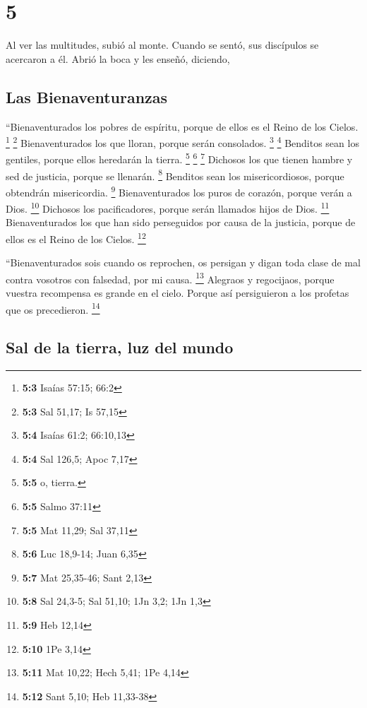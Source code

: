 \hypertarget{section-4}{%
\section{5}\label{section-4}}

 Al ver las multitudes, subió al monte. Cuando se sentó,
sus discípulos se acercaron a él.  Abrió la boca y les
enseñó, diciendo,

\hypertarget{las-bienaventuranzas}{%
\subsection{Las Bienaventuranzas}\label{las-bienaventuranzas}}

 ``Bienaventurados los pobres de espíritu, porque de ellos
es el Reino de los Cielos. \footnote{\textbf{5:3} Isaías 57:15; 66:2}
\footnote{\textbf{5:3} Sal 51,17; Is 57,15} 
Bienaventurados los que lloran, porque serán consolados. \footnote{\textbf{5:4}
  Isaías 61:2; 66:10,13} \footnote{\textbf{5:4} Sal 126,5; Apoc 7,17}
 Benditos sean los gentiles, porque ellos heredarán la
tierra. \footnote{\textbf{5:5} o, tierra.} \footnote{\textbf{5:5} Salmo
  37:11} \footnote{\textbf{5:5} Mat 11,29; Sal 37,11} 
Dichosos los que tienen hambre y sed de justicia, porque se llenarán.
\footnote{\textbf{5:6} Luc 18,9-14; Juan 6,35}  Benditos
sean los misericordiosos, porque obtendrán misericordia. \footnote{\textbf{5:7}
  Mat 25,35-46; Sant 2,13}  Bienaventurados los puros de
corazón, porque verán a Dios. \footnote{\textbf{5:8} Sal 24,3-5; Sal
  51,10; 1Jn 3,2; 1Jn 1,3}  Dichosos los pacificadores,
porque serán llamados hijos de Dios. \footnote{\textbf{5:9} Heb 12,14}
 Bienaventurados los que han sido perseguidos por causa
de la justicia, porque de ellos es el Reino de los Cielos. \footnote{\textbf{5:10}
  1Pe 3,14}

 ``Bienaventurados sois cuando os reprochen, os persigan
y digan toda clase de mal contra vosotros con falsedad, por mi causa.
\footnote{\textbf{5:11} Mat 10,22; Hech 5,41; 1Pe 4,14} 
Alegraos y regocijaos, porque vuestra recompensa es grande en el cielo.
Porque así persiguieron a los profetas que os precedieron. \footnote{\textbf{5:12}
  Sant 5,10; Heb 11,33-38}

\hypertarget{sal-de-la-tierra-luz-del-mundo}{%
\subsection{Sal de la tierra, luz del
mundo}\label{sal-de-la-tierra-luz-del-mundo}}

